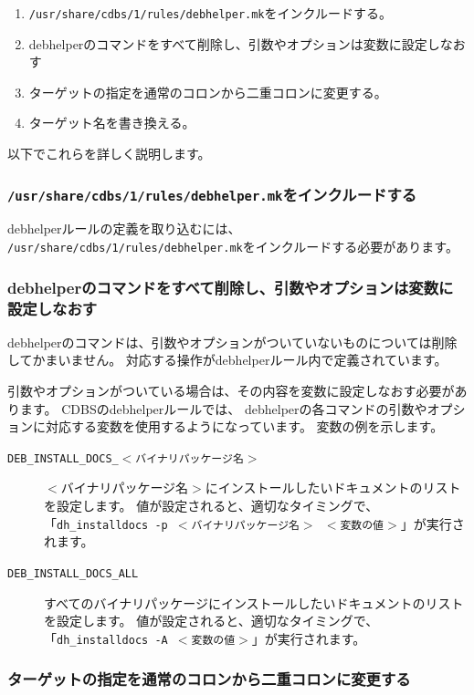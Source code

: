 \documentclass[mingoth,a4paper]{jsarticle}
\begin{document}
\begin{enumerate}
 \item \texttt{/usr/share/cdbs/1/rules/debhelper.mk}をインクルードする。
 \item debhelperのコマンドをすべて削除し、引数やオプションは変数に設定しなおす
 \item ターゲットの指定を通常のコロンから二重コロンに変更する。
 \item ターゲット名を書き換える。
\end{enumerate}

以下でこれらを詳しく説明します。

\subsubsection{\texttt{/usr/share/cdbs/1/rules/debhelper.mk}をインクルードする}

debhelperルールの定義を取り込むには、
\texttt{/usr/share/cdbs/1/rules/debhelper.mk}をインクルードする必要があります。

\subsubsection{debhelperのコマンドをすべて削除し、引数やオプションは変数に設定しなおす}

debhelperのコマンドは、引数やオプションがついていないものについては削除してかまいません。
対応する操作がdebhelperルール内で定義されています。

引数やオプションがついている場合は、その内容を変数に設定しなおす必要があります。
CDBSのdebhelperルールでは、
debhelperの各コマンドの引数やオプションに対応する変数を使用するようになっています。
変数の例を示します。

\begin{description}
 \item[\texttt{DEB\_INSTALL\_DOCS\_$<$バイナリパッケージ名$>$}]
    $<$バイナリパッケージ名$>$にインストールしたいドキュメントのリストを設定します。
    値が設定されると、適切なタイミングで、
    「\texttt{dh\_installdocs -p $<$バイナリパッケージ名$>$ $<$変数の値$>$}」が実行されます。
 \item[\texttt{DEB\_INSTALL\_DOCS\_ALL}]
    すべてのバイナリパッケージにインストールしたいドキュメントのリストを設定します。
    値が設定されると、適切なタイミングで、
    「\texttt{dh\_installdocs -A $<$変数の値$>$}」が実行されます。
\end{description}

\subsubsection{ターゲットの指定を通常のコロンから二重コロンに変更する}
\end{document}
